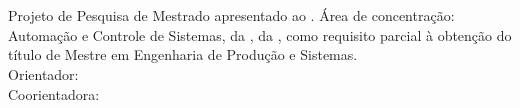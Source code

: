 \begin{center}
    {\singlespacing
    \MakeUppercase{\textbf{\aluno}} \\ [5cm]

    \MakeUppercase{\titulo}\\ [1cm]
    
    \hspace{.45\textwidth} %
        \begin{minipage}{.5\textwidth}
        \noindent Projeto de Pesquisa de Mestrado apresentado ao \curso. Área de concentração: Automação e Controle de Sistemas, da \departamento, da \universidade, como requisito parcial à obtenção do título de Mestre em Engenharia de Produção e Sistemas.\\ [5mm]
        \noindent Orientador: \orientador\\
        \noindent Coorientadora: \coorientador
        \end{minipage}
    
    \vfill
    
    \MakeUppercase{\cidade} \\ 
    \ano}
\end{center}